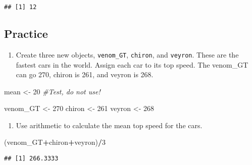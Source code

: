 \documentclass[
]{article}
\newenvironment{Shaded}{\begin{snugshade}}{\end{snugshade}}
\newcommand{\CommentTok}[1]{\textcolor[rgb]{0.56,0.35,0.01}{\textit{#1}}}
\newcommand{\DecValTok}[1]{\textcolor[rgb]{0.00,0.00,0.81}{#1}}
\newcommand{\NormalTok}[1]{#1}
\newcommand{\OtherTok}[1]{\textcolor[rgb]{0.56,0.35,0.01}{#1}}
\newcommand{\SpecialCharTok}[1]{\textcolor[rgb]{0.81,0.36,0.00}{\textbf{#1}}}
\providecommand{\tightlist}{%
  \setlength{\itemsep}{0pt}\setlength{\parskip}{0pt}}
\begin{document}
\begin{verbatim}
## [1] 12
\end{verbatim}

\hypertarget{practice}{%
\subsection{Practice}\label{practice}}

\begin{enumerate}
\def\labelenumi{\arabic{enumi}.}
\tightlist
\item
  Create three new objects, \texttt{venom\_GT}, \texttt{chiron}, and
  \texttt{veyron}. These are the fastest cars in the world. Assign each
  car to its top speed. The venom\_GT can go 270, chiron is 261, and
  veyron is 268.
\end{enumerate}

\begin{Shaded}
\begin{Highlighting}[]
\NormalTok{mean }\OtherTok{\textless{}{-}} \DecValTok{20} \CommentTok{\#Test, do not use!}
\end{Highlighting}
\end{Shaded}

\begin{Shaded}
\begin{Highlighting}[]
\NormalTok{venom\_GT }\OtherTok{\textless{}{-}} \DecValTok{270}
\NormalTok{chiron }\OtherTok{\textless{}{-}} \DecValTok{261}
\NormalTok{veyron }\OtherTok{\textless{}{-}} \DecValTok{268} 
\end{Highlighting}
\end{Shaded}

\begin{enumerate}
\def\labelenumi{\arabic{enumi}.}
\setcounter{enumi}{1}
\tightlist
\item
  Use arithmetic to calculate the mean top speed for the cars.
\end{enumerate}

\begin{Shaded}
\begin{Highlighting}[]
\NormalTok{(venom\_GT}\SpecialCharTok{+}\NormalTok{chiron}\SpecialCharTok{+}\NormalTok{veyron)}\SpecialCharTok{/}\DecValTok{3}
\end{Highlighting}
\end{Shaded}

\begin{verbatim}
## [1] 266.3333
\end{verbatim}
\end{document}
